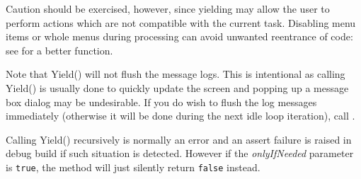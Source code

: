Caution should be exercised, however, since yielding may allow the
user to perform actions which are not compatible with the current task.
Disabling menu items or whole menus during processing can avoid unwanted
reentrance of code: see  for a better
function.

Note that Yield() will not flush the message logs. This is intentional as
calling Yield() is usually done to quickly update the screen and popping up a
message box dialog may be undesirable. If you do wish to flush the log
messages immediately (otherwise it will be done during the next idle loop
iteration), call .

Calling Yield() recursively is normally an error and an assert failure is
raised in debug build if such situation is detected. However if the 
{\it onlyIfNeeded} parameter is {\tt true}, the method will just silently
return {\tt false} instead.

